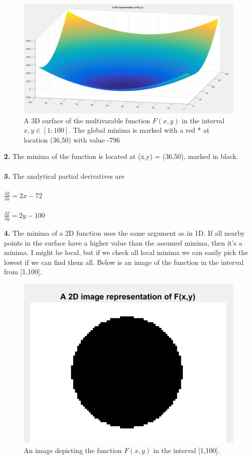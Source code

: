 \documentclass[]{article}
\begin{document}
\begin{figure}[H]
\centering
\includegraphics[scale=0.50]{task2a.PNG}
\caption{A 3D surface of the multivarable function $F(x,y)$ in the interval $x,y \in [1:100]$. The global minima is marked with a red * at location (36,50) with value -796}
\label{fig:fxy}
\end{figure}
\textbf{2.} The minima of the function is located at (x,y) = (36,50), marked in black.\\\\
\textbf{3.} The analytical partial derivatives are\\\\
$\frac{\partial f}{\partial x} = 2x - 72$\\\\ 
$\frac{\partial f}{\partial y} = 2y - 100$


\textbf{4.} The minima of a 2D function uses the same argument as in 1D. If all nearby points in the surface have a higher value than the assumed minima, then it's a minima. I might be local, but if we check all local minima we can easily pick the lowest if we can find them all. Below is an image of the function in the interval from [1,100].

\begin{figure}[H]
\centering
\includegraphics[scale=1]{task2b.PNG}
\caption{An image depicting the function $F(x,y)$ in the interval [1,100].}
\label{fig:img}
\end{figure}
\end{document}
